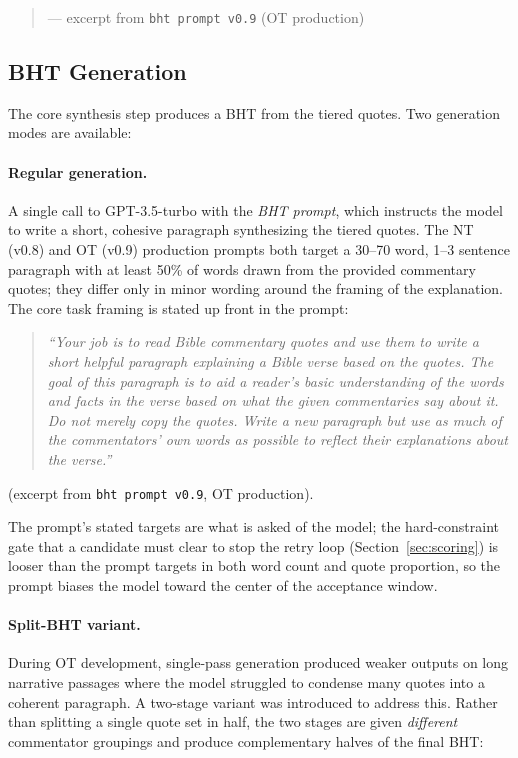 \begin{quote}
\small


\vspace{0.1em}
\raggedleft --- excerpt from \texttt{bht prompt v0.9} (OT production)
\end{quote}

\subsection{BHT Generation}
\label{sec:bhtgen}

The core synthesis step produces a BHT from the tiered quotes. Two generation modes are available:

\paragraph{Regular generation.} A single call to GPT-3.5-turbo with the \textit{BHT prompt}, which instructs the model to write a short, cohesive paragraph synthesizing the tiered quotes. The NT (v0.8) and OT (v0.9) production prompts both target a 30--70 word, 1--3 sentence paragraph with at least 50\% of words drawn from the provided commentary quotes; they differ only in minor wording around the framing of the explanation. The core task framing is stated up front in the prompt:

\begin{quote}
\textit{``Your job is to read Bible commentary quotes and use them to write a short helpful paragraph explaining a Bible verse based on the quotes. The goal of this paragraph is to aid a reader's basic understanding of the words and facts in the verse based on what the given commentaries say about it. Do not merely copy the quotes. Write a new paragraph but use as much of the commentators' own words as possible to reflect their explanations about the verse.''}
\end{quote}
\noindent (excerpt from \texttt{bht prompt v0.9}, OT production).

\noindent The prompt's stated targets are what is asked of the model; the hard-constraint gate that a candidate must clear to stop the retry loop (Section~\ref{sec:scoring}) is looser than the prompt targets in both word count and quote proportion, so the prompt biases the model toward the center of the acceptance window.

\paragraph{Split-BHT variant.} During OT development, single-pass generation produced weaker outputs on long narrative passages where the model struggled to condense many quotes into a coherent paragraph. A two-stage variant was introduced to address this. Rather than splitting a single quote set in half, the two stages are given \emph{different} commentator groupings and produce complementary halves of the final BHT:

